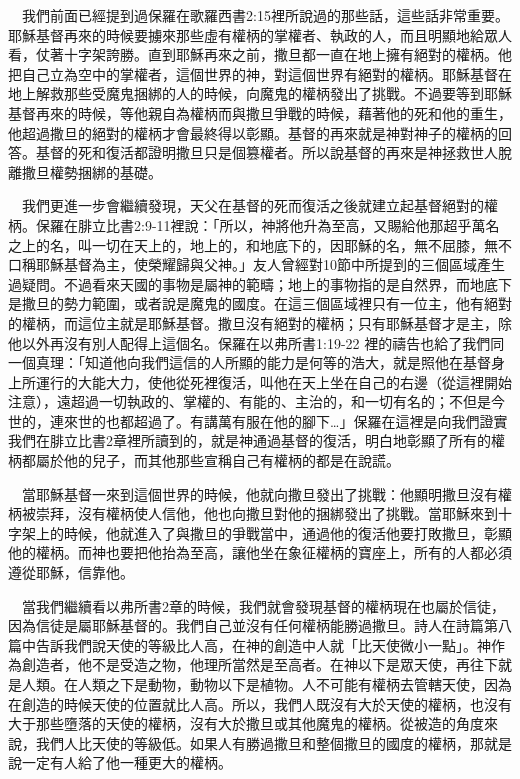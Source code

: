 \documentclass{book}
\begin{document}
　我們前面已經提到過保羅在歌羅西書2:15裡所說過的那些話，這些話非常重要。耶穌基督再來的時候要擄來那些虛有權柄的掌權者、執政的人，而且明顯地給眾人看，仗著十字架誇勝。直到耶穌再來之前，撒旦都一直在地上擁有絕對的權柄。他把自己立為空中的掌權者，這個世界的神，對這個世界有絕對的權柄。耶穌基督在地上解救那些受魔鬼捆綁的人的時候，向魔鬼的權柄發出了挑戰。不過要等到耶穌基督再來的時候，等他親自為權柄而與撒旦爭戰的時候，藉著他的死和他的重生，他超過撒旦的絕對的權柄才會最終得以彰顯。基督的再來就是神對神子的權柄的回答。基督的死和復活都證明撒旦只是個篡權者。所以說基督的再來是神拯救世人脫離撒旦權勢捆綁的基礎。

　我們更進一步會繼續發現，天父在基督的死而復活之後就建立起基督絕對的權柄。保羅在腓立比書2:9-11裡說：「所以，神將他升為至高，又賜給他那超乎萬名之上的名，叫一切在天上的，地上的，和地底下的，因耶穌的名，無不屈膝，無不口稱耶穌基督為主，使榮耀歸與父神。」友人曾經對10節中所提到的三個區域產生過疑問。不過看來天國的事物是屬神的範疇；地上的事物指的是自然界，而地底下是撒旦的勢力範圍，或者說是魔鬼的國度。在這三個區域裡只有一位主，他有絕對的權柄，而這位主就是耶穌基督。撒旦沒有絕對的權柄；只有耶穌基督才是主，除他以外再沒有別人配得上這個名。保羅在以弗所書1:19-22 裡的禱告也給了我們同一個真理：「知道他向我們這信的人所顯的能力是何等的浩大，就是照他在基督身上所運行的大能大力，使他從死裡復活，叫他在天上坐在自己的右邊（從這裡開始注意），遠超過一切執政的、掌權的、有能的、主治的，和一切有名的；不但是今世的，連來世的也都超過了。有講萬有服在他的腳下…」保羅在這裡是向我們證實我們在腓立比書2章裡所讀到的，就是神通過基督的復活，明白地彰顯了所有的權柄都屬於他的兒子，而其他那些宣稱自己有權柄的都是在說謊。

　當耶穌基督一來到這個世界的時候，他就向撒旦發出了挑戰：他顯明撒旦沒有權柄被崇拜，沒有權柄使人信他，他也向撒旦對他的捆綁發出了挑戰。當耶穌來到十字架上的時候，他就進入了與撒旦的爭戰當中，通過他的復活他要打敗撒旦，彰顯他的權柄。而神也要把他抬為至高，讓他坐在象征權柄的寶座上，所有的人都必須遵從耶穌，信靠他。

　當我們繼續看以弗所書2章的時候，我們就會發現基督的權柄現在也屬於信徒，因為信徒是屬耶穌基督的。我們自己並沒有任何權柄能勝過撒旦。詩人在詩篇第八篇中告訴我們說天使的等級比人高，在神的創造中人就「比天使微小一點」。神作為創造者，他不是受造之物，他理所當然是至高者。在神以下是眾天使，再往下就是人類。在人類之下是動物，動物以下是植物。人不可能有權柄去管轄天使，因為在創造的時候天使的位置就比人高。所以，我們人既沒有大於天使的權柄，也沒有大于那些墮落的天使的權柄，沒有大於撒旦或其他魔鬼的權柄。從被造的角度來說，我們人比天使的等級低。如果人有勝過撒旦和整個撒旦的國度的權柄，那就是說一定有人給了他一種更大的權柄。
\end{document}
